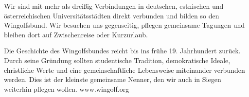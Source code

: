 	\addPage
	{}
	{\false}
	{}
	{}
	{\SeiteDreiTitel}
	{
		Wir sind mit mehr als dreißig Verbindungen in deutschen, estnischen und österreichischen Universitätsstädten direkt verbunden und bilden so den Wingolfsbund. Wir besuchen uns gegenseitig, pflegen gemeinsame Tagungen und bleiben dort auf Zwischenreise oder Kurzurlaub.\par
		Die Geschichte des Wingolfsbundes reicht bis ins frühe 19. Jahrhundert zurück. Durch seine Gründ\-ung sollten studentische Tradition, demokratische Ideale, christliche Werte und eine gemeinschaftliche Lebensweise miteinander verbunden werden. Dies ist der kleinste gemeinsame Nenner, den wir auch in Siegen weiterhin pflegen wollen.
		\vfill
		www.wingolf.org
	}